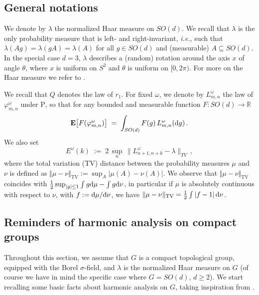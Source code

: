 \documentclass[a4paper,reqno,11pt]{amsart}
\numberwithin{equation}{section}
\newcommand{\gl}{\lambda}
\newcommand{\gs}{\sigma}
\newcommand{\gp}{\varphi}
\newcommand{\go}{\omega}
\newcommand{\dd}{\text{\rm d}}             %
\newcommand{\R}{\mathbb{R}}
\def\bP{\ensuremath{\bs{\mathrm{P}}}}
\def\bE{\ensuremath{\bs{\mathrm{E}}}}
\def\bs{\boldsymbol}
\begin{document}
\subsection{General notations}

\label{sec:notations}

We denote by $\gl$ the normalized Haar measure on $SO(d)$. We recall that $\gl$ is
the only probability measure that is left- and right-invariant,
{\sl i.e.}, such that $\gl(A g) = \gl (gA) = \gl(A)$
for all $g \in SO(d)$ and (measurable) $A \subseteq SO(d)$.
In the special case $d=3$, $\gl$ describes a (random) rotation around the axis $x$ of angle $\theta$, where $x$ is uniform on $S^{2}$ and $\theta$ is uniform on $[0, 2\pi)$.
For more on the Haar measure we refer to \cite{cf:Halmos}.

We recall that $Q$ denotes the law of $r_1$.
For fixed $\go$,
we denote by $L_{m,n}^\go$ the law of $\gp_{m,n}^\go$ under $\bP$, so that
for any bounded and measurable function $F: SO(d) \to \R$
\begin{equation}
\bE\big[ F(\gp_{m,n}^\go) \big] \;=\; \int_{SO(d)} F(g) \, L_{m,n}^\go(\dd g) \,.
\end{equation}
We also set
\begin{equation}\label{eq:Ek}
E^\go(k) \;:=\; 2 \, \sup_{n} \, \| L^\go_{n+1, n+k} - \gl \|_{TV} \,,
\end{equation}
where the total variation (TV) distance between
the probability measures $\mu$ and $\nu$
is defined as $\Vert \mu -\nu \Vert_{\text{TV}} :=
\sup_A \vert \mu(A) -\nu (A)\vert$. We observe that
$\Vert \mu -\nu \Vert_{\text{TV}}$ coincides with
$\frac 12 \sup_{\vert g\vert \le 1}\int g \dd \mu - \int g \dd \nu$,
in particular if $\mu$ is absolutely continuous with respect to $\nu$,
with $f := \dd \mu/\dd \nu$, we have $\| \mu - \nu \|_{\text{TV}} =
\frac 12 \int |f - 1 | \, \dd \nu$.



\subsection{Reminders of harmonic analysis on compact groups}

Throughout this section, we assume that $G$ is a compact topological group,
equipped with the Borel $\gs$-field,
and $\lambda$ is the normalized Haar measure on $G$
(of course we have in mind the specific case where $G=SO(d)$, $d \ge 2$).
We start recalling some basic facts about harmonic analysis on $G$,
taking inspiration from \cite{cf:Hewitt1,cf:Hewitt2}.
\end{document}
